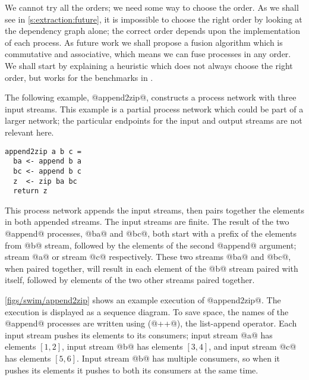 We cannot try all the orders; we need some way to choose the order.
As we shall see in \autoref{s:extraction:future}, it is impossible to choose the right order by looking at the dependency graph alone; the correct order depends upon the implementation of each process.
As future work we shall propose a fusion algorithm which is commutative and associative, which means we can fuse processes in any order.
We shall start by explaining a heuristic which does not always choose the right order, but works for the benchmarks in .

The following example, @append2zip@, constructs a process network with three input streams.
This example is a partial process network which could be part of a larger network; the particular endpoints for the input and output streams are not relevant here.

\begin{lstlisting}
append2zip a b c =
  ba <- append b a
  bc <- append b c
  z  <- zip ba bc
  return z
\end{lstlisting}

This process network appends the input streams, then pairs together the elements in both appended streams.
The input streams are finite.
The result of the two @append@ processes, @ba@ and @bc@, both start with a prefix of the elements from @b@ stream, followed by the elements of the second @append@ argument; stream @a@ or stream @c@ respectively.
These two streams @ba@ and @bc@, when paired together, will result in each element of the @b@ stream paired with itself, followed by elements of the two other streams paired together.


\autoref{figs/swim/append2zip} shows an example execution of @append2zip@.
The execution is displayed as a sequence diagram.
To save space, the names of the @append@ processes are written using (@++@), the list-append operator.
Each input stream pushes its elements to its consumers; input stream @a@ has elements $[1, 2]$, input stream @b@ has elements $[3, 4]$, and input stream @c@ has elements $[5, 6]$.
Input stream @b@ has multiple consumers, so when it pushes its elements it pushes to both its consumers at the same time.


